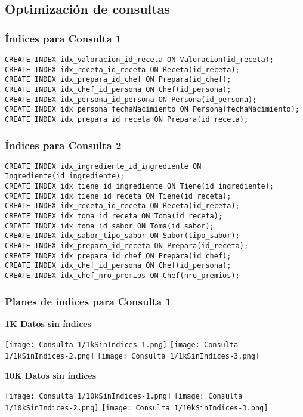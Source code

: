 \documentclass[12pt,a4paper]{article}
\begin{document}
\subsection{Optimización de consultas}
\subsubsection{Índices para Consulta 1}
\begin{lstlisting}
CREATE INDEX idx_valoracion_id_receta ON Valoracion(id_receta);
CREATE INDEX idx_receta_id_receta ON Receta(id_receta);
CREATE INDEX idx_prepara_id_chef ON Prepara(id_chef);
CREATE INDEX idx_chef_id_persona ON Chef(id_persona);
CREATE INDEX idx_persona_id_persona ON Persona(id_persona);
CREATE INDEX idx_persona_fechaNacimiento ON Persona(fechaNacimiento);
CREATE INDEX idx_prepara_id_receta ON Prepara(id_receta);
\end{lstlisting}
\subsubsection{Índices para Consulta 2}
\begin{lstlisting}
CREATE INDEX idx_ingrediente_id_ingrediente ON Ingrediente(id_ingrediente);
CREATE INDEX idx_tiene_id_ingrediente ON Tiene(id_ingrediente);
CREATE INDEX idx_tiene_id_receta ON Tiene(id_receta);
CREATE INDEX idx_receta_id_receta ON Receta(id_receta);
CREATE INDEX idx_toma_id_receta ON Toma(id_receta);
CREATE INDEX idx_toma_id_sabor ON Toma(id_sabor);
CREATE INDEX idx_sabor_tipo_sabor ON Sabor(tipo_sabor);
CREATE INDEX idx_prepara_id_receta ON Prepara(id_receta);
CREATE INDEX idx_prepara_id_chef ON Prepara(id_chef);
CREATE INDEX idx_chef_id_persona ON Chef(id_persona);
CREATE INDEX idx_chef_nro_premios ON Chef(nro_premios);
\end{lstlisting}
\subsubsection{Planes de índices para Consulta 1}
\textbf{1K Datos sin índices}
\begin{center}
    \texttt{[image: Consulta 1/1kSinIndices-1.png]}
    \texttt{[image: Consulta 1/1kSinIndices-2.png]}
    \texttt{[image: Consulta 1/1kSinIndices-3.png]}
\end{center}

\textbf{10K Datos sin índices}
\begin{center}
    \texttt{[image: Consulta 1/10kSinIndices-1.png]}
    \texttt{[image: Consulta 1/10kSinIndices-2.png]}
    \texttt{[image: Consulta 1/10kSinIndices-3.png]}
\end{center}
\end{document}
